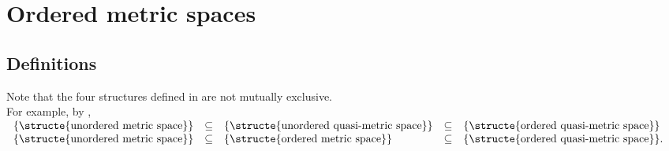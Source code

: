 
\section{Ordered metric spaces}
\subsection{Definitions}
\begin{definition}
\label{def:oms}
\label{def:oqms}
\end{definition}

\begin{remark}
Note that the four structures defined in  are not mutually exclusive.\\
For example, by ,
\\{$\begin{array}{lclcl}
  \{\text{\structe{unordered metric space}}\}       &\subseteq&
  \{\text{\structe{unordered quasi-metric space}}\} &\subseteq&
  \{\text{\structe{ordered quasi-metric space}}\}  
  \\
  \{\text{\structe{unordered metric space}}\}       &\subseteq&
  \{\text{\structe{ordered   metric space}}\}       &\subseteq& 
  \{\text{\structe{ordered quasi-metric space}}\}.  
\end{array}$}
\end{remark}

